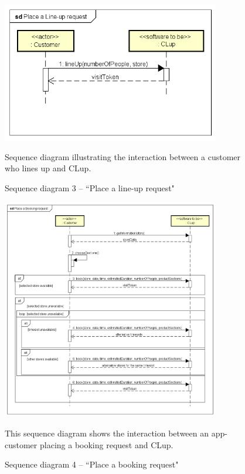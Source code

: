 \documentclass[a4paper,oneside,11pt]{book}   %
\newcommand{\captionrasd}[2]{\caption{#1}\par\begin{center}\vspace{-.01\textheight}\small#2.\end{center}}
\begin{document}
    \begin{figure}[H]
        \centering
        \includegraphics[width=0.85\textwidth, keepaspectratio]{pictures/sequence_diagrams/place_line-up_request}
        \captionrasd{Sequence diagram 3 -- ``Place a line-up request"}{Sequence diagram illustrating the interaction between a customer who lines up and CLup}
        \label{figure:sequence_diagram_3_place_lineup_request}
    \end{figure}
    
    \begin{figure}[H]
        \centering
        \includegraphics[width=0.85\textwidth, keepaspectratio]{pictures/sequence_diagrams/place_booking_request}
        \captionrasd{Sequence diagram 4 -- ``Place a booking request"}{This sequence diagram shows the interaction between an app-customer placing a booking request and CLup}
        \label{figure:sequence_diagram_4_place_booking_request}
    \end{figure}
\end{document}
